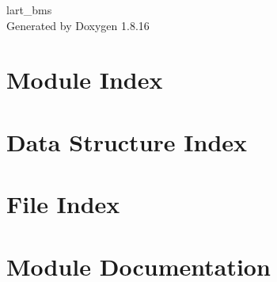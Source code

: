 \let\mypdfximage\pdfximage\def\pdfximage{\immediate\mypdfximage}\documentclass[twoside]{book}
\newcommand{\+}{\discretionary{\mbox{\scriptsize$\hookleftarrow$}}{}{}}
\newcommand{\clearemptydoublepage}{%
  \newpage{\pagestyle{empty}\cleardoublepage}%
}
\begin{document}
\hypersetup{pageanchor=false,
             bookmarksnumbered=true,
             pdfencoding=unicode
            }
\begin{titlepage}
\vspace*{7cm}
\begin{center}%
{\Large lart\+\_\+bms }\\
\vspace*{1cm}
{\large Generated by Doxygen 1.8.16}\\
\end{center}
\end{titlepage}
\clearemptydoublepage
{}
\tableofcontents
\clearemptydoublepage
{}
\hypersetup{pageanchor=true}

\chapter{Module Index}

\chapter{Data Structure Index}

\chapter{File Index}

\chapter{Module Documentation}









\end{document}
